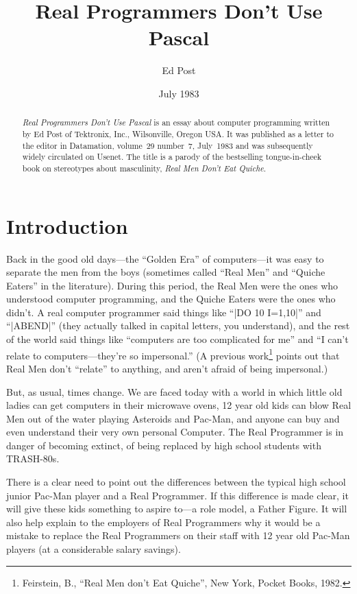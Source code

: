 \documentclass[10pt,letterpaper]{article}
\title{Real Programmers Don't Use Pascal}
\author{Ed Post}
\date{July 1983}
\newcommand{\acro}[1]{{\small #1\spacefactor1000}}
\begin{document}
\maketitle

\begin{abstract}
\emph{Real Programmers Don't Use Pascal} is an essay
about computer programming written by Ed Post of Tektronix, Inc.,
Wilsonville, Oregon USA\@. It was published as a letter to the
editor in Datamation, volume~29 number~7, July~1983 and was
subsequently widely circulated on Usenet. The title is a parody of the
bestselling tongue-in-cheek book on stereotypes about masculinity,
\emph{Real Men Don't Eat Quiche}.
\end{abstract}

\section*{Introduction}
Back in the good old days---the ``Golden Era'' of computers---it was
easy to separate the men from the boys (sometimes called ``Real Men''
and ``Quiche Eaters'' in the literature). During this period, the Real
Men were the ones who understood computer programming, and the Quiche
Eaters were the ones who didn't. A real computer programmer said
things like ``|DO 10 I=1,10|'' and ``|ABEND|'' (they actually
talked in capital letters, you understand), and the rest of the world
said things like ``computers are too complicated for me'' and ``I
can't relate to computers---they're so impersonal.'' (A previous
work\footnote{Feirstein, B., ``Real Men don't Eat Quiche'', New
  York, Pocket Books, 1982.} points out that Real Men don't ``relate''
to anything, and aren't afraid of being impersonal.)

But, as usual, times change. We are faced today with a world in which
little old ladies can get computers in their microwave ovens, 12 year
old kids can blow Real Men out of the water playing Asteroids and
Pac-Man, and anyone can buy and even understand their very own
personal Computer. The Real Programmer is in danger of becoming
extinct, of being replaced by high school students with \acro{TRASH}-80s.

There is a clear need to point out the differences between the typical
high school junior Pac-Man player and a Real Programmer. If this
difference is made clear, it will give these kids something to aspire
to---a role model, a Father Figure. It will also help explain to the
employers of Real Programmers why it would be a mistake to replace the
Real Programmers on their staff with 12 year old Pac-Man players (at a
considerable salary savings).
\end{document}
